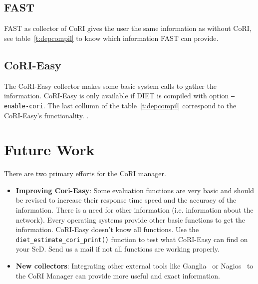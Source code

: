 \subsection{FAST}
FAST as collector of CoRI gives the user the same information as
without CoRI, see table~\ref{t:depcompil} to know which information FAST can
provide.

\subsection{CoRI-Easy}
The CoRI-Easy collector makes some basic system calls to gather the
information. CoRI-Easy is only available if DIET is compiled with option
\texttt{--enable-cori}. The last collumn of the table~\ref{t:depcompil}
correspond to the CoRI-Easy's functionality. .

\section{Future Work}

There are two primary efforts for the CoRI manager.
\begin{itemize}
\item \textbf{Improving Cori-Easy}: Some evaluation functions are very basic and
  should be revised to increase their response time speed and the
  accuracy of the information.
  There is a need for other information (i.e. information about the network).
  Every operating systems provide other basic functions to get the information.
  CoRI-Easy doesn't know all functions. Use the \texttt{diet\_estimate\_cori\_print()}
function to test what CoRI-Easy can find on your SeD. Send us a mail if not 
all functions are working properly.

\item \textbf{New collectors}:
  Integrating other external tools like Ganglia~\cite{Ganglia} or Nagios~\cite{Nagios} to the
  CoRI Manager can provide more useful and exact information.
\end{itemize}

